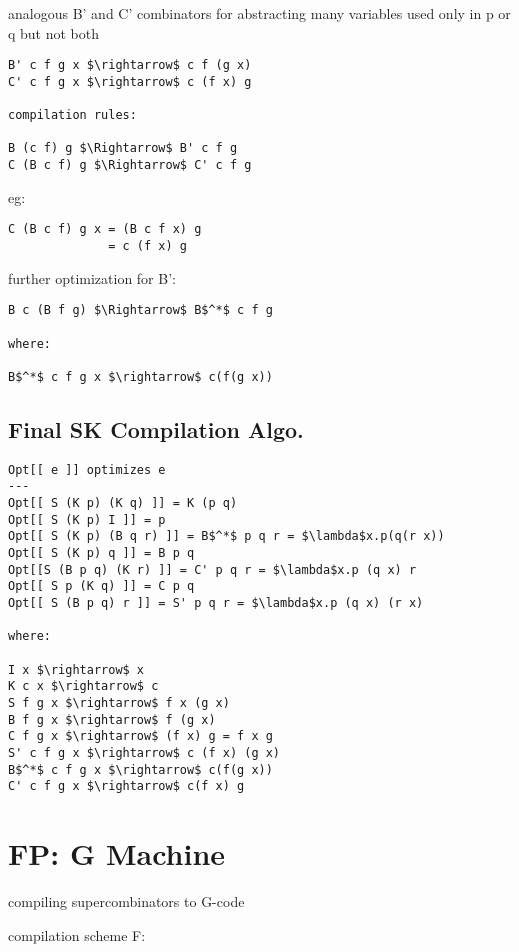 \documentclass[8pt]{extarticle}
\begin{document}
\begin{multicols*}{2}
analogous B' and C' combinators for abstracting many variables used only in p or q but not both

\begin{lstlisting}
B' c f g x $\rightarrow$ c f (g x)
C' c f g x $\rightarrow$ c (f x) g

compilation rules:

B (c f) g $\Rightarrow$ B' c f g
C (B c f) g $\Rightarrow$ C' c f g
\end{lstlisting}

eg:

\begin{lstlisting}
C (B c f) g x = (B c f x) g
              = c (f x) g  
\end{lstlisting}

further optimization for B':

\begin{lstlisting}
B c (B f g) $\Rightarrow$ B$^*$ c f g

where:

B$^*$ c f g x $\rightarrow$ c(f(g x))
\end{lstlisting}

\subsection{Final SK Compilation Algo.}
\begin{lstlisting}
Opt[[ e ]] optimizes e
---
Opt[[ S (K p) (K q) ]] = K (p q)
Opt[[ S (K p) I ]] = p
Opt[[ S (K p) (B q r) ]] = B$^*$ p q r = $\lambda$x.p(q(r x))
Opt[[ S (K p) q ]] = B p q
Opt[[S (B p q) (K r) ]] = C' p q r = $\lambda$x.p (q x) r
Opt[[ S p (K q) ]] = C p q
Opt[[ S (B p q) r ]] = S' p q r = $\lambda$x.p (q x) (r x)

where:

I x $\rightarrow$ x
K c x $\rightarrow$ c
S f g x $\rightarrow$ f x (g x)
B f g x $\rightarrow$ f (g x)
C f g x $\rightarrow$ (f x) g = f x g
S' c f g x $\rightarrow$ c (f x) (g x)
B$^*$ c f g x $\rightarrow$ c(f(g x))
C' c f g x $\rightarrow$ c(f x) g
\end{lstlisting}

\vfill\null
\columnbreak

\section{FP: G Machine}

compiling supercombinators to G-code

compilation scheme F:


\end{multicols*}
\end{document}
